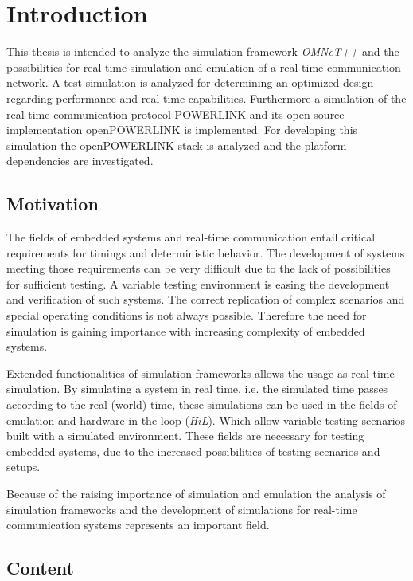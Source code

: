 \chapter{Introduction}
\label{cha:introduction}
This thesis is intended to analyze the simulation framework \emph{OMNeT++} \cite{omnet_manual} and the possibilities for real-time simulation and emulation of a real time communication network.
A test simulation is analyzed for determining an optimized design regarding performance and real-time capabilities.
Furthermore a simulation of the real-time communication protocol POWERLINK and its open source implementation \mbox{openPOWERLINK} \cite{openpowerlink} is implemented. 
For developing this simulation the openPOWERLINK stack is analyzed and the platform dependencies are investigated.

\section{Motivation}
The fields of embedded systems and real-time communication entail critical requirements for timings and deterministic behavior.
The development of systems meeting those requirements can be very difficult due to the lack of possibilities for sufficient testing.
A variable testing environment is easing the development and verification of such systems.
The correct replication of complex scenarios and special operating conditions is not always possible.
Therefore the need for simulation is gaining importance with increasing complexity of embedded systems.

Extended functionalities of simulation frameworks allows the usage as real-time simulation.
By simulating a system in real time, i.e. the simulated time passes according to the real (world) time, these simulations can be used in the fields of emulation and hardware in the loop (\emph{HiL}).
Which allow variable testing scenarios built with a simulated environment.
These fields are necessary for testing embedded systems, due to the increased possibilities of testing scenarios and setups.

Because of the raising importance of simulation and emulation the analysis of simulation frameworks and the development of simulations for real-time communication systems represents an important field.

\section{Content}

